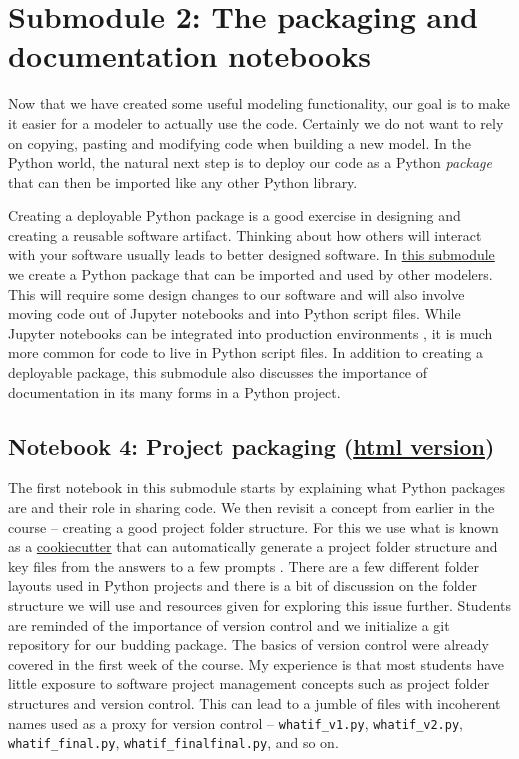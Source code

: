 \documentclass[ited,blindrev]{informs3}              %
\newcommand{\code}[1]{\texttt{#1}}
\begin{document}
\section{Submodule 2: The packaging and documentation notebooks}

Now that we have created some useful modeling functionality, our goal is to make it easier for a modeler to actually use the code. Certainly we do not want to rely on copying, pasting and modifying code when building a new model. In the Python world, the natural next step is to deploy our code as a Python \textit{package} \cite{buezenWelcomePythonPackages2022} that can then be imported like any other Python library.

Creating a deployable Python package is a good exercise in designing and creating a reusable software artifact. Thinking about how others will interact with your software usually leads to better designed software.  In \href{http://www.sba.oakland.edu/faculty/isken/courses/aap/mod3b_whatif_packaging.html}{this submodule} we create a Python package that can be imported and used by other modelers. This will require some design changes to our software and will also involve moving code out of Jupyter notebooks and into Python script files. While Jupyter notebooks can be integrated into production environments \cite{uffordInteractiveNotebookInnovation2019}, it is much more common for code to live in Python script files. In addition to creating a deployable package, this submodule also discusses the importance of documentation in its many forms in a Python project.

\subsection{Notebook 4: Project packaging (\href{http://www.sba.oakland.edu/faculty/isken/excel_with_python/what_if_4_project_packaging.html}{html version})}

The first notebook in this submodule starts by explaining what Python packages are and their role in sharing code. We then revisit a concept from earlier in the course -- creating a good project folder structure. For this we use what is known as a \href{https://cookiecutter.readthedocs.io/en/stable/}{cookiecutter} that can automatically generate a project folder structure and key files from the answers to a few prompts \cite{audreyroyandcookiecuttercommunityCookiecutterBetterProject2012}. There are a few different folder layouts used in Python projects and there is a bit of discussion on the folder structure we will use and resources given for exploring this issue further. Students are reminded of the importance of version control and we initialize a git repository for our budding package. The basics of version control were already covered in the first week of the course. My experience is that most students have little exposure to software project management concepts such as project folder structures and version control. This can lead to a jumble of files with incoherent names used as a proxy for version control -- \code{whatif\_v1.py}, \code{whatif\_v2.py}, \code{whatif\_final.py}, \code{whatif\_finalfinal.py}, and so on.
\end{document}
